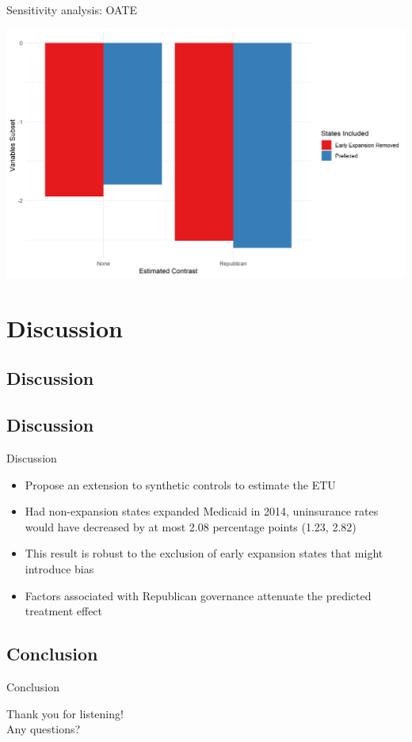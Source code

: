 \documentclass[hyperref={pdfpagelabels=false}]{beamer}
\begin{document}
\begin{frame}{Sensitivity analysis: OATE}
    \begin{center}
	\includegraphics[scale=0.5]{01_Plots/oate-comparison-repub-c1c2.png}
    \end{center}
\end{frame}

\section{Discussion}

\subsection{Discussion}

\subsection{Discussion}

\begin{frame}{Discussion}
\begin{itemize}
    \item Propose an extension to synthetic controls to estimate the ETU \bigskip
    \item Had non-expansion states expanded Medicaid in 2014, uninsurance rates would have decreased by at most 2.08 percentage points (1.23, 2.82) \bigskip
    \item This result is robust to the exclusion of early expansion states that might introduce bias \bigskip
    \item Factors associated with Republican governance attenuate the predicted treatment effect
\end{itemize}
\end{frame}

\subsection{Conclusion}
\begin{frame}{Conclusion}
\begin{center}
Thank you for listening! \\ \newline \newline Any questions?
\end{center}
\end{frame}
\end{document}
